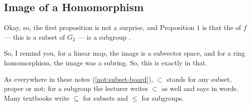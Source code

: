 \subsection{Image of a Homomorphism}

\begin{speech}[00:01:15 - 00:01:42]
Okay, so, the first proposition is not a surprise, and Proposition $1$ is that the  of $f$ --- this is a subset of $G_2$ --- is a subgroup .

So, I remind you, for a linear map, the image is a subvector space, and for a ring homomorphism, the image was a subring. So, this is exactly in that.
\end{speech}

\begin{content}

\end{content}

\begin{aiNote}
As everywhere in these notes (\cref{not:subset-board}), $\subset$ stands for any subset, proper or not; for a subgroup the lecturer writes $\subset$ as well and says  in words. Many textbooks write $\subseteq$ for subsets and $\le$ for subgroups.
\end{aiNote}

